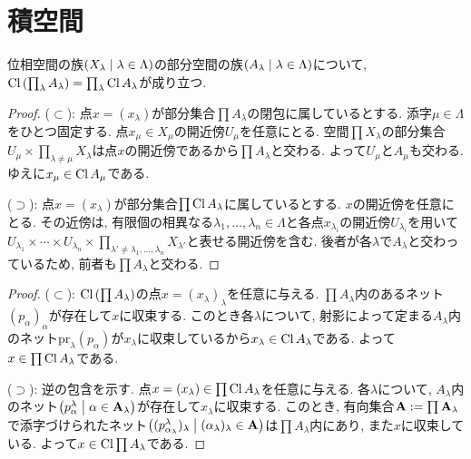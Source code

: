 \documentclass[uplatex, dvipdfmx, a4paper, 12pt, class=jsbook, crop=false]{standalone}
\begin{document}
\section{積空間}
\label{sec:product-spaces}

\newcommand{\directedA}{\mathbf{A}} %
\newcommand{\proj}{\mathrm{pr}} %

\begin{proposition}
	位相空間の族$\setfamily{X_\lambda}{\lambda \in \Lambda}$の部分空間の族$\setfamily{A_\lambda}{\lambda \in \Lambda}$について, $ \mathop{\mathrm{Cl}}\nolimits \left(\prod_\lambda A_\lambda\right) = \prod_\lambda \mathop{\mathrm{Cl}}\nolimits A_\lambda $が成り立つ.
\end{proposition}

\begin{proof}
	($\subset$):
	点$x = (x_\lambda)$が部分集合$\prod A_\lambda$の閉包に属しているとする.
	添字$\mu \in \Lambda$をひとつ固定する.
	点$x_\mu \in X_\mu$の開近傍$U_\mu$を任意にとる.
	空間$\prod X_\lambda$の部分集合$U_\mu \times \prod_{\lambda \neq \mu} X_{\lambda}$は点$x$の開近傍であるから$\prod A_{\lambda}$と交わる.
	よって$U_\mu$と$A_\mu$も交わる. ゆえに$x_\mu \in \mathop{\mathrm{Cl}}\nolimits A_\mu$である.

	($\supset$):
	点$x = (x_\lambda)$が部分集合$\prod \mathop{\mathrm{Cl}}\nolimits A_\lambda$に属しているとする.
	$x$の開近傍を任意にとる.
	その近傍は, 有限個の相異なる$\lambda_1, \ldots, \lambda_n \in \Lambda$と各点$x_{\lambda_i}$の開近傍$U_{\lambda_i}$を用いて$U_{\lambda_1} \times \cdots \times U_{\lambda_n} \times \prod_{\lambda' \neq \lambda_1, \ldots, \lambda_n} X_{\lambda'}$と表せる開近傍を含む.
	後者が各$\lambda$で$A_\lambda$と交わっているため, 前者も$\prod A_\lambda$と交わる.
\end{proof}

\begin{proof}
	($\subset$):
	$\mathop{\mathrm{Cl}}\nolimits \left(\prod A_\lambda\right)$の点$x = (x_\lambda)_\lambda$を任意に与える.
	$\prod A_\lambda$内のあるネット$(p_\alpha)_\alpha$が存在して$x$に収束する.
	このとき各$\lambda$について, 射影によって定まる$A_\lambda$内のネット$\proj_\lambda (p_\alpha)$が$x_\lambda$に収束しているから$x_\lambda \in \mathop{\mathrm{Cl}}\nolimits A_\lambda$である.
	よって$x \in \prod \mathop{\mathrm{Cl}}\nolimits A_\lambda$である.

	($\supset$):
	逆の包含を示す.
	点$x = (x_\lambda) \in \prod \mathop{\mathrm{Cl}}\nolimits A_\lambda$を任意に与える.
	各$\lambda$について, $A_\lambda$内のネット$\setfamily{p^\lambda_\alpha}{\alpha \in \directedA_\lambda}$が存在して$x_\lambda$に収束する.
	このとき, 有向集合$\directedA \defeq \prod \directedA_\lambda$で添字づけられたネット$\setfamily{(p^\lambda_{\alpha_\lambda})_\lambda}{(\alpha_\lambda)_\lambda \in \directedA}$は$\prod A_\lambda$内にあり, また$x$に収束している.
	よって$x \in \mathop{\mathrm{Cl}}\nolimits \prod A_\lambda$である.
\end{proof}
\end{document}
